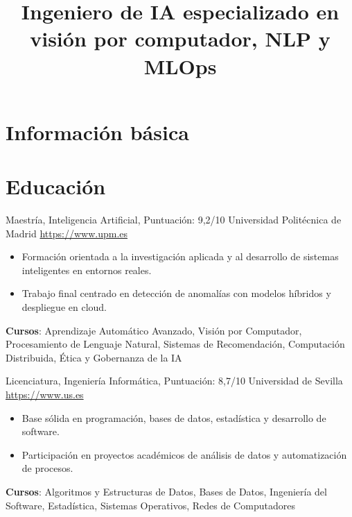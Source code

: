 \documentclass[a4paper, serif, 10pt]{moderncv}
\title{Ingeniero de IA especializado en visión por computador, NLP y MLOps}
\begin{document}
\maketitle

\section{Información básica}

\section{Educación}

        {Maestría, Inteligencia Artificial, Puntuación: 9,2/10}
        {Universidad Politécnica de Madrid}
        {\url{https://www.upm.es}}
        {}
        {\begin{itemize}
\item Formación orientada a la investigación aplicada y al desarrollo de sistemas inteligentes en entornos reales.
\item Trabajo final centrado en detección de anomalías con modelos híbridos y despliegue en cloud.
\end{itemize}
\textbf{Cursos}: Aprendizaje Automático Avanzado, Visión por Computador, Procesamiento de Lenguaje Natural, Sistemas de Recomendación, Computación Distribuida, Ética y Gobernanza de la IA}

        {Licenciatura, Ingeniería Informática, Puntuación: 8,7/10}
        {Universidad de Sevilla}
        {\url{https://www.us.es}}
        {}
        {\begin{itemize}
\item Base sólida en programación, bases de datos, estadística y desarrollo de software.
\item Participación en proyectos académicos de análisis de datos y automatización de procesos.
\end{itemize}
\textbf{Cursos}: Algoritmos y Estructuras de Datos, Bases de Datos, Ingeniería del Software, Estadística, Sistemas Operativos, Redes de Computadores}
\end{document}

